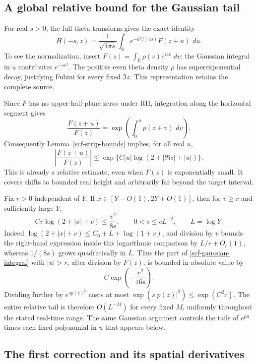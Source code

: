\documentclass[11pt]{article}
\newcommand{\R}{\mathbb R}
\newcommand{\dd}{\,d}
\theoremstyle{remark}
\begin{document}
\subsection{A global relative bound for the Gaussian tail}

For real $s>0$, the full theta transform gives the exact identity
\begin{equation}\label{scf-gaussian-integral}
 H(-s,z)=\frac1{\sqrt{4\pi s}}\int_\R
                 e^{-u^2/(4s)}F(z+u)\,\dd u.
\end{equation}
To see the normalization, insert
$F(z)=\int_\R\rho(v)e^{izv}\,\dd v$: the Gaussian integral in $u$
contributes $e^{-sv^2}$.  The positive even theta density $\rho$ has
superexponential decay, justifying Fubini for every fixed $\Im z$.
This representation retains the complete source.

Since $F$ has no upper-half-plane zeros under RH, integration along the
horizontal segment gives
\[
 \frac{F(z+u)}{F(z)}
       =\exp\left(\int_0^u p(z+v)\,\dd v\right).
\]
Consequently Lemma~\ref{scf-strip-bounds} implies, for all real $u$,
\begin{equation}\label{scf-global-ratio}
 \left|\frac{F(z+u)}{F(z)}\right|
 \le\exp\{C|u|\log(2+|\Re z|+|u|)\}.
\end{equation}
This is already a relative estimate, even when $F(z)$ is exponentially
small.  It covers shifts to bounded real height and arbitrarily far
beyond the target interval.

Fix $r>0$ independent of $Y$.  If $x\in[Y-O(1),2Y+O(1)]$, then for
$v\ge r$ and sufficiently large $Y$,
\[
 Cv\log(2+|x|+v)\le\frac{v^2}{8s},
 \qquad 0<s\le cL^{-2},\qquad L=\log Y.
\]
Indeed $\log(2+|x|+v)\le C_0+L+\log(1+v)$, and division by $v$
bounds the right-hand expression inside this logarithmic comparison by
$L/r+O_r(1)$, whereas $1/(8s)$ grows quadratically in $L$.
Thus the part of \eqref{scf-gaussian-integral} with $|u|>r$, after
division by $F(z)$, is bounded in absolute value by
\begin{equation}\label{scf-tail}
 C\exp\left(-\frac{r^2}{16s}\right).
\end{equation}
Dividing further by $e^{sp(z)^2}$ costs at most
$\exp(s|p(z)|^2)\le\exp(C^2c)$.
The entire relative tail is therefore $O(L^{-M})$ for every fixed $M$,
uniformly throughout the stated real-time range.  The same Gaussian
argument controls the tails of $e^{pu}$ times each fixed polynomial in
$u$ that appears below.

\subsection{The first correction and its spatial derivatives}
\end{document}

